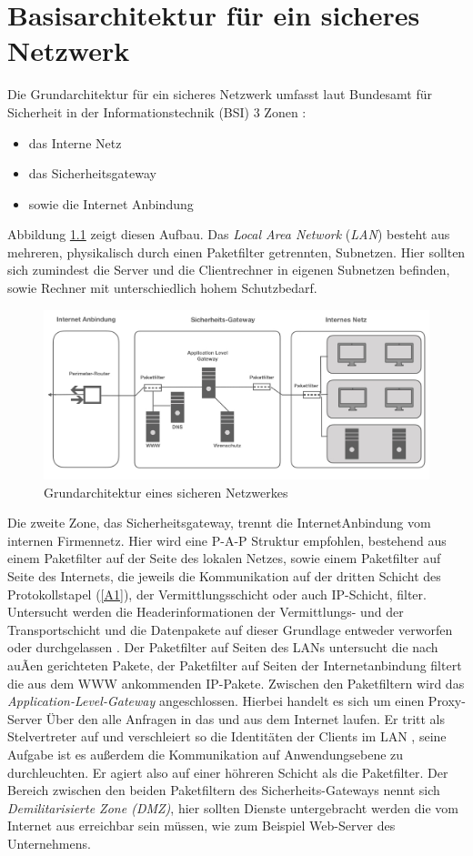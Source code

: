 \chapter{Basisarchitektur für ein sicheres Netzwerk}
Die Grundarchitektur für ein sicheres Netzwerk umfasst laut Bundesamt für Sicherheit in der Informationstechnik (BSI) 3 Zonen \cite{isi-lana}: 
\begin{itemize}
	\item das Interne Netz 
	\item das Sicherheitsgateway
	\item sowie die Internet Anbindung	
\end{itemize}
Abbildung \ref{grundarch} zeigt diesen Aufbau. Das \emph{Local Area Network} (\emph{LAN}) besteht aus mehreren, physikalisch durch einen Paketfilter getrennten, Subnetzen. Hier sollten sich zumindest die Server und die Clientrechner in eigenen Subnetzen befinden, sowie Rechner mit unterschiedlich hohem Schutzbedarf. 

\begin{figure}
	\includegraphics[width=\linewidth]{grundarchitektur}
	\caption{Grundarchitektur eines sicheren Netzwerkes}
	\label{grundarch}
\end{figure}


Die zweite Zone, das Sicherheitsgateway, trennt die InternetAnbindung vom internen Firmennetz. Hier wird eine P-A-P Struktur empfohlen, bestehend aus einem Paketfilter auf der Seite des lokalen Netzes, sowie einem Paketfilter auf Seite des Internets, die jeweils die Kommunikation auf der dritten Schicht des Protokollstapel (\ref{A1}), der Vermittlungsschicht oder auch IP-Schicht, filter. Untersucht werden die Headerinformationen der Vermittlungs- und der Transportschicht und die Datenpakete auf dieser Grundlage entweder verworfen oder durchgelassen  \cite{isi-lana}.
 Der Paketfilter auf Seiten des LANs untersucht die nach auÃen gerichteten Pakete, der Paketfilter auf Seiten der Internetanbindung filtert die aus dem WWW ankommenden IP-Pakete. Zwischen den Paketfiltern wird das \emph{Application-Level-Gateway} angeschlossen. Hierbei handelt es sich um einen Proxy-Server Über den alle Anfragen in das und aus dem Internet laufen. Er tritt als Stelvertreter auf und verschleiert so die Identitäten der  Clients im LAN \cite{zisler2018computer}, seine Aufgabe ist es außerdem die Kommunikation auf Anwendungsebene zu durchleuchten. Er agiert also auf einer höhreren Schicht als die Paketfilter. 
 Der Bereich zwischen den beiden Paketfiltern des Sicherheits-Gateways nennt sich \emph{Demilitarisierte Zone (DMZ)}, hier sollten Dienste untergebracht werden die vom Internet aus erreichbar sein müssen, wie zum Beispiel Web-Server des Unternehmens. 
 

